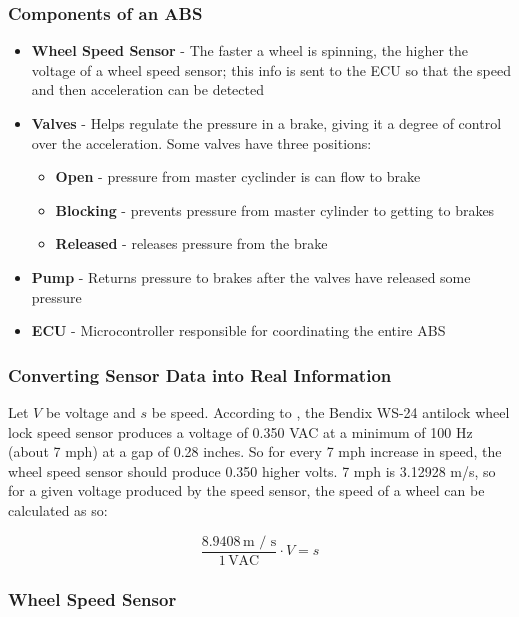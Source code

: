 \documentclass{beamer}
\begin{document}
\begin{frame}
  \frametitle{Components of an ABS}
  \begin{itemize}
  \item \textbf{Wheel Speed Sensor} - The faster a wheel is spinning, the higher
    the voltage of a wheel speed sensor; this info is sent to the ECU so that
    the speed and then acceleration can be detected
  \item \textbf{Valves} - Helps regulate the pressure in a brake, giving it a degree
    of control over the acceleration. Some valves have three positions:
    \begin{itemize}
    \item \textbf{Open} - pressure from master cyclinder is can flow to brake
    \item \textbf{Blocking} - prevents pressure from master cylinder to getting to brakes
    \item \textbf{Released} - releases pressure from the brake
    \end{itemize}
  \item \textbf{Pump} - Returns pressure to brakes after the valves have released some pressure
  \item \textbf{ECU} - Microcontroller responsible for coordinating the entire ABS
  \end{itemize}
\end{frame}

\begin{frame}
  \frametitle{Converting Sensor Data into Real Information}

  Let \(V\) be voltage and \(s\) be speed. According to \cite{ws24}, the Bendix
  WS-24 antilock wheel lock speed sensor produces a voltage of 0.350 VAC
  at a minimum of 100 Hz (about 7 mph) at a gap of 0.28 inches. So for every
  7 mph increase in speed, the wheel speed sensor should produce 0.350 higher
  volts. 7 mph is 3.12928 m/s, so for a given voltage produced by the speed sensor,
  the speed of a wheel can be calculated as so:

  \[\frac{8.9408 \, \textrm{m / s}}{1 \, \textrm{VAC}} \cdot V = s \]
\end{frame}

\begin{frame}
  \frametitle{Wheel Speed Sensor}
\end{frame}
\end{document}
